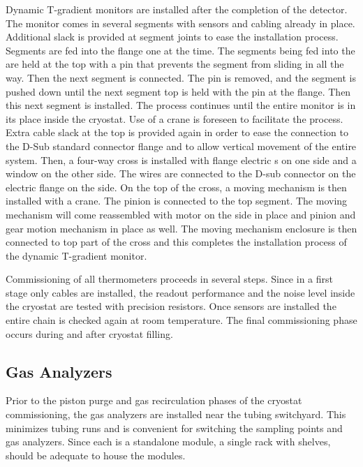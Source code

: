 Dynamic T-gradient monitors are installed after the completion of the detector.
The monitor comes in several segments with sensors and cabling already
in place. Additional slack is provided at segment joints to ease the
installation process. Segments are fed into the flange one at the
time. The segments being fed into the  are held at the top
with a pin that prevents the segment from sliding in all the way. Then the next
segment is connected. The pin is removed, and the
segment is pushed down until the next segment top is held with the
pin at the flange. Then this next segment is installed. The
process  continues until the entire monitor is in its place
inside the cryostat. Use of a crane is foreseen to facilitate the process.
Extra cable slack at the top is provided again in order to ease  the
connection to the D-Sub standard connector flange and to allow  vertical movement of the
entire system. Then,  a four-way cross is installed with flange electric \fdth{}s on
one side and a window on the other side. 
The wires are connected to
the D-sub connector on the electric flange \fdth on the side. On the
top of the cross, a moving mechanism is then installed with a crane.
The pinion is connected to the top segment. The moving mechanism will
come reassembled with motor on the side in place and pinion and gear
motion mechanism in place as well. The moving mechanism enclosure  is then connected to top part of the cross and this completes the
installation process of the dynamic T-gradient monitor.

Commissioning of all thermometers proceeds in several steps. Since in a first stage only cables are installed,
the readout performance and the noise level inside the cryostat are
tested with precision resistors. Once sensors are installed the entire chain is checked again at room temperature.
The final commissioning phase occurs during and after cryostat filling.  


\subsection{Gas Analyzers}
\label{sec:fdgen-slow-cryo-install-ga}
 
Prior to the piston purge and gas recirculation phases of the cryostat commissioning, the gas analyzers are installed near the %
tubing switchyard. This minimizes tubing runs and is  convenient for switching the sampling points and gas analyzers. Since each is a standalone module, a single rack with shelves, should be adequate to house the modules.

